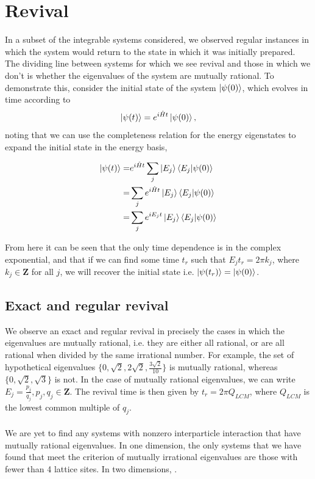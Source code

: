 \documentclass[a4paper,10pt]{article}
\begin{document}
\section{Revival}
In a subset of the integrable systems considered, we observed regular instances in which the system would return to the state in which it was initially prepared. The dividing line between
systems for which we see revival and those in which we don't is whether the eigenvalues of the system are mutually rational. To demonstrate this, consider the initial state of the system $\ket{\psi(0)}$, which evolves in time according to
\begin{equation}
 \ket{\psi(t)}=e^{i\hat{H}t}\ket{\psi(0)},
\end{equation}
noting that we can use the completeness relation for the energy eigenstates to expand the initial state in the energy basis,

\begin{align}
 \ket{\psi(t)} =&       e^{i\hat{H}t}\sum_j\ket{E_j}\braket{E_j|\psi(0)} \\
               =&\sum_je^{i\hat{H}t}\ket{E_j}\braket{E_j|\psi(0)} \\
                =&\sum_je^{iE_{j}t}\ket{E_j}\braket{E_j|\psi(0)} \\
\end{align}

From here it can be seen that the only time dependence is in the complex exponential, and that if we can find some time $t_r$ such that $E_{j}t_r=2\pi k_{j}$, where $k_j\in \mathbf{Z}$ for all $j$, 
we will recover the initial state i.e. $\ket{\psi(t_r)}=\ket{\psi(0)}$.\\

\subsection{Exact and regular revival}
We observe an exact and regular revival in precisely the cases in which the eigenvalues are mutually rational, i.e. they are either all rational, or are all rational when divided by the same irrational number. 
For example, the set of hypothetical eigenvalues $\{0,\sqrt{2},2\sqrt{2},\frac{3\sqrt{2}}{10}\}$ is mutually rational, whereas $\{0,\sqrt{2},\sqrt{3}\}$ is not. In the case of mutually rational eigenvalues, we can write
${E_j}=\frac{p_j}{q_j},p_j,q_j \in \mathbf{Z}$. The revival time is then given by $t_r=2\pi Q_{LCM}$, where $Q_{LCM}$ is the lowest common multiple of ${q_j}$. 
\\\\
We are yet to find any systems with nonzero interparticle interaction that have mutually rational eigenvalues.
In one dimension, the only systems that we have found that meet the criterion of mutually irrational eigenvalues are those with fewer than 4 lattice sites. In two
dimensions, .
\end{document}
